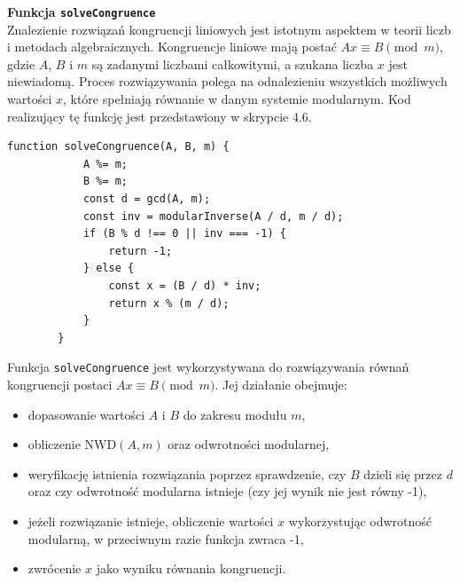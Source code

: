 \documentclass{SGGW-thesis}
\begin{document}
	\noindent \textbf{Funkcja \texttt{solveCongruence}}
	\vspace{1em}
	\\
	Znalezienie rozwiązań kongruencji liniowych jest istotnym aspektem w teorii liczb i metodach algebraicznych. Kongruencje liniowe mają postać \(Ax \equiv B \pmod{m}\), gdzie \(A\), \(B\) i \(m\) są zadanymi liczbami całkowitymi, a szukana liczba \(x\) jest niewiadomą. Proces rozwiązywania polega na odnalezieniu wszystkich możliwych wartości \(x\), które spełniają równanie w danym systemie modularnym. Kod realizujący tę funkcję jest przedstawiony w skrypcie 4.6.
	\vspace{1em}
	\begin{lstlisting}[caption=Funkcja rozwiązująca kongruencję liniową w JavaScript]
		function solveCongruence(A, B, m) {
			A %= m;
			B %= m;
			const d = gcd(A, m);
			const inv = modularInverse(A / d, m / d);
			if (B % d !== 0 || inv === -1) {
				return -1;
			} else {
				const x = (B / d) * inv;
				return x % (m / d);
			}
		}
	\end{lstlisting}
	\vspace{1em}
	Funkcja \texttt{solveCongruence} jest wykorzystywana do rozwiązywania równań kongruencji postaci \(Ax \equiv B \pmod{m}\). Jej działanie obejmuje:
	\begin{itemize}
		\item dopasowanie wartości \(A\) i \(B\) do zakresu modułu \(m\),
		\item obliczenie \( \text{NWD}(A, m) \) oraz odwrotności modularnej,
		\item weryfikację istnienia rozwiązania poprzez sprawdzenie, czy \(B\) dzieli się przez \(d\) oraz czy odwrotność modularna istnieje (czy jej wynik nie jest równy -1),
		\item jeżeli rozwiązanie istnieje, obliczenie wartości \(x\) wykorzystując odwrotność modularną, w przeciwnym razie funkcja zwraca -1,
		\item zwrócenie \(x\) jako wyniku równania kongruencji.
	\end{itemize}
	\newpage
	
\end{document}
